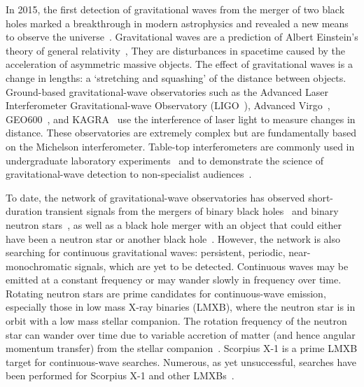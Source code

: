 \documentclass[paper-main.tex]{subfiles}
\begin{document}
In 2015, the first detection of gravitational waves from the merger of two black holes marked a breakthrough in modern astrophysics and revealed a new means to observe the universe~\cite{GW150914}.
Gravitational waves are a prediction of Albert Einstein's theory of general relativity~\cite{Einstein:1916}, 
They are disturbances in spacetime caused by the acceleration of asymmetric massive objects.
The effect of gravitational waves is a change in lengths: a `stretching and squashing' of the distance between objects. 
Ground-based gravitational-wave observatories such as the Advanced Laser Interferometer Gravitational-wave Observatory (LIGO~\cite{AdvancedLIGO:2015}), Advanced Virgo~\cite{AdvancedVirgo:2015}, GEO600~\cite{GEO600:2010}, and KAGRA~\cite{KAGRA:2013} use the interference of laser light to measure changes in distance. 
These observatories are extremely complex but are fundamentally based on the Michelson interferometer. 
Table-top interferometers are commonly used in undergraduate laboratory experiments~\cite{UgoliniEtAl:2019} and to demonstrate the science of gravitational-wave detection to non-specialist audiences~\cite{ThorLabsIFO,NikhefIFO,AMIGO:online,TTExhibit:2020,LIGOIFOGlue,LIGOIFOMagnets}.


To date, the network of gravitational-wave observatories has observed short-duration transient signals from the mergers of binary black holes~\cite{GW150914,GW151226,GW170104,GW170814,GW190521,GWTC-1:2018,GWTC-2:2020} and binary neutron stars~\cite{GW170817,GW170817multi,GW190425,GWTC-1:2018,GWTC-2:2020}, as well as a black hole merger with an object that could either have been a neutron star or another black hole~\cite{GW190814}. 
However, the network is also searching for continuous gravitational waves: persistent, periodic, near-monochromatic signals, which are yet to be detected. 
Continuous waves may be emitted at a constant frequency or may wander slowly in frequency over time. 
Rotating neutron stars are prime candidates for continuous-wave emission, especially those in low mass X-ray binaries (LMXB), where the neutron star is in orbit with a low mass stellar companion.
The rotation frequency of the neutron star can wander over time due to variable accretion of matter (and hence angular momentum transfer) from the stellar companion~\cite{xraybinaries:1997}. 
Scorpius X-1 is a prime LMXB target for continuous-wave searches. 
Numerous, as yet unsuccessful, searches have been performed for Scorpius X-1 and other LMXBs~\cite{ScoX1O2Viterbi:2019, ScoX1ViterbiO1:2017, RadiometerO1O2:2019, SearchRadiometerO1:2017, SearchCrossCorrO1:2017, ScoX1ViterbiO1:2017, SearchTwoSpecS6:2017, MiddletonEtAlO2LMXBs:2020}. 
\end{document}
